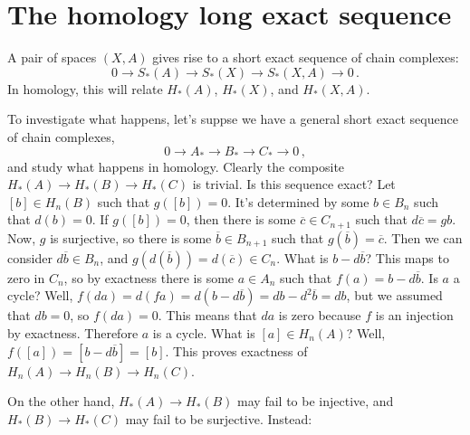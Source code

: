 \section{The homology long exact sequence}

A pair of spaces $(X,A)$ gives rise to a short exact sequence of chain 
complexes:
\[
0\to S_*(A)\to S_*(X)\to S_*(X,A)\to0\,.
\]
In homology, this will relate $H_*(A)$, $H_*(X)$, and $H_*(X,A)$. 

To investigate what happens, let's suppse we have a general short exact 
sequence of chain complexes,
\[
0\to A_*\to B_*\to C_*\to0\,,
\]
and study what happens in homology. 
Clearly the composite $H_*(A)\to H_*(B)\to H_*(C)$ is trivial. Is this sequence
exact?  
Let $[b]\in H_n(B)$ such that $g([b])=0$. It's determined by some $b\in B_n$ such that $d(b)=0$. If $g([b])=0$, then there is some $\overline{c}\in C_{n+1}$ such that $d\overline{c}=gb$. Now, $g$ is surjective, so there is some $\overline{b}\in B_{n+1}$ such that $g(\overline{b})=\overline{c}$. Then we can consider $d\overline{b}\in B_n$, and $g(d(\overline{b}))=d(\overline{c})\in C_n$. What is $b-d\overline{b}$? This maps to zero in $C_n$, so by exactness there is some $a\in A_n$ such that $f(a)=b-d\overline{b}$. Is $a$ a cycle? Well, $f(da)=d(fa)=d(b-d\overline{b})=db-d^2\overline{b}=db$, but we assumed that $db=0$, so $f(da)=0$. This means that $da$ is zero because $f$ is an injection by exactness. Therefore $a$ is a cycle. What is $[a]\in H_n(A)$? Well, $f([a])=[b-d\overline{b}]=[b]$. This proves exactness of $ H_n(A)\to H_n(B)\to H_n(C)$.

On the other hand, $H_*(A)\to H_*(B)$ may fail to be injective, and 
$H_*(B)\to H_*(C)$ may fail to be surjective. Instead:

